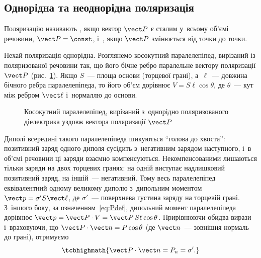 \subsection*{Однорідна та неоднорідна поляризація}


Поляризацію називають , якщо вектор $\vect P$ є сталим у~всьому об'ємі
речовини, $\vect P = \const$, і~, якщо $\vect P$ змінюється від точки
до точки.

 Нехай поляризація однорідна. Розглянемо косокутний
паралелепіпед, вирізаний із поляризованої речовини так, що його бічне ребро паралельне
вектору поляризації $\vect P$ (рис.~\ref{pic:PolarizedParallelepiped}). Якщо $S$~--- площа
основи (торцевої грані), а~$\ell$~--- довжина бічного ребра паралелепіпеда, то його об'єм
дорівнює $V = S\ell\cos\theta$, де $\theta$~--- кут між ребром $\vect \ell$ і~нормаллю до
основи.

\begin{figure}\centering
	\caption{Косокутний паралелепіпед, вирізаний з~однорідно поляризованого діелектрика
		уздовж вектора поляризації $\vect P$\label{pic:PolarizedParallelepiped}}
\end{figure}

Диполі всередині такого паралелепіпеда шикуються \enquote{голова до хвоста}: позитивний
заряд одного диполя сусідить з~негативним зарядом наступного, і~в об'ємі речовини ці
заряди взаємно компенсуються. Некомпенсованими лишаються тільки заряди на двох торцевих
гранях: на одній виступає надлишковий позитивний заряд, на іншій~--- негативний. Тому весь
паралелепіпед еквівалентний одному великому диполю з~дипольним моментом $\vect p = \sigma'
	S \vect \ell$, де $\sigma'$~--- поверхнева густина 
заряду на торцевій грані. З~іншого боку, за означенням~\eqref{eq:Pdef}, дипольний момент
паралелепіпеда дорівнює $\vect p = \vect P \cdot V = \vect P \, S\ell\cos\theta$.
Прирівнюючи обидва вирази і~враховуючи, що $\vect P \cdot \vect n = P\cos\theta$ (де
$\vect n$~--- зовнішня нормаль до грані), отримуємо
\begin{equation}\label{eq:SigmaPrime}
	\tcbhighmath{
		\vect P \cdot \vect n = P_n = \sigma'.
	}
\end{equation}

